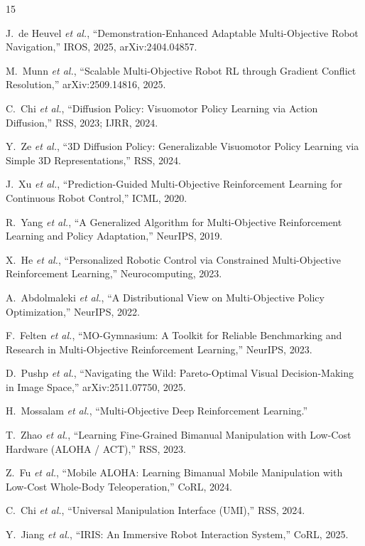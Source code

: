 \documentclass[journal]{IEEEtran}
\begin{document}
\begin{thebibliography}{15}

J.~de Heuvel \emph{et al.},
``Demonstration-Enhanced Adaptable Multi-Objective Robot Navigation,''
IROS, 2025, arXiv:2404.04857.

M.~Munn \emph{et al.},
``Scalable Multi-Objective Robot RL through Gradient Conflict
Resolution,''
arXiv:2509.14816, 2025.

C.~Chi \emph{et al.},
``Diffusion Policy: Visuomotor Policy Learning via Action Diffusion,''
RSS, 2023; IJRR, 2024.

Y.~Ze \emph{et al.},
``3D Diffusion Policy: Generalizable Visuomotor Policy Learning via
Simple 3D Representations,''
RSS, 2024.

J.~Xu \emph{et al.},
``Prediction-Guided Multi-Objective Reinforcement Learning for
Continuous Robot Control,''
ICML, 2020.

R.~Yang \emph{et al.},
``A Generalized Algorithm for Multi-Objective Reinforcement Learning
and Policy Adaptation,''
NeurIPS, 2019.

X.~He \emph{et al.},
``Personalized Robotic Control via Constrained Multi-Objective
Reinforcement Learning,''
Neurocomputing, 2023.

A.~Abdolmaleki \emph{et al.},
``A Distributional View on Multi-Objective Policy Optimization,''
NeurIPS, 2022.

F.~Felten \emph{et al.},
``MO-Gymnasium: A Toolkit for Reliable Benchmarking and Research in
Multi-Objective Reinforcement Learning,''
NeurIPS, 2023.

D.~Pushp \emph{et al.},
``Navigating the Wild: Pareto-Optimal Visual Decision-Making in Image
Space,''
arXiv:2511.07750, 2025.

H.~Mossalam \emph{et al.},
``Multi-Objective Deep Reinforcement Learning.''

T.~Zhao \emph{et al.},
``Learning Fine-Grained Bimanual Manipulation with Low-Cost Hardware
(ALOHA / ACT),''
RSS, 2023.

Z.~Fu \emph{et al.},
``Mobile ALOHA: Learning Bimanual Mobile Manipulation with Low-Cost
Whole-Body Teleoperation,''
CoRL, 2024.

C.~Chi \emph{et al.},
``Universal Manipulation Interface (UMI),''
RSS, 2024.

Y.~Jiang \emph{et al.},
``IRIS: An Immersive Robot Interaction System,''
CoRL, 2025.

\end{thebibliography}
\end{document}
